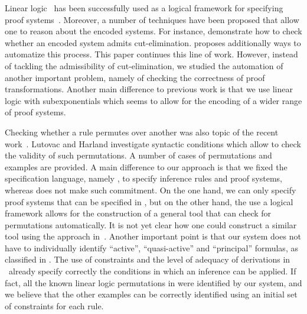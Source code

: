 Linear logic~\cite{girard87tcs} has been successfully used as a logical
framework for specifying
proof systems~\cite{miller.ep,nigam10jar,cervesato02ic}. Moreover, a number
of techniques have been proposed that allow one to reason about the
encoded systems. For instance, \cite{miller.ep,pfenning95lics} demonstrate
how to check whether an encoded system admits cut-elimination.
\cite{miller.ep} proposes additionally ways to automatize this process. 
This paper continues this line of work. However, instead of tackling the
admissibility of cut-elimination, we studied the automation of another
important problem, namely of checking the correctness of proof
transformations. Another main difference to previous work is that we use
linear logic with subexponentials which seems to allow for the encoding of
a wider range of proof systems. 

Checking whether a rule permutes over another was also topic
of the recent work~\cite{lutovac.unp}. Lutovac and Harland investigate
syntactic conditions which allow to check the validity of such
permutations. A number of cases of permutations and examples are
provided. A main difference to our approach is that we fixed
the specification language, namely \sellf, to specify inference rules and
proof systems, whereas \cite{lutovac.unp} does not make such commitment. 
On the one hand, we can only specify proof systems that can be specified in
\sellf, but on the other hand, the use a logical framework allows for the
construction of a general tool that can check for permutations
automatically. It is not yet clear how one could construct a similar tool
using the approach in~\cite{lutovac.unp}. Another important point is that our
system does not have to individually identify ``active'', ``quasi-active'' and
``principal'' formulas, as classified in \cite{lutovac.unp}. The use of
constraints and the level of adequacy of derivations in \sellf\ already specify
correctly the conditions in which an inference can be applied. If fact, all the
known linear logic permutations in \cite{lutovac.unp} were identified by our
system, and we believe that the other examples can be correctly identified using
an initial set of constraints for each rule.


